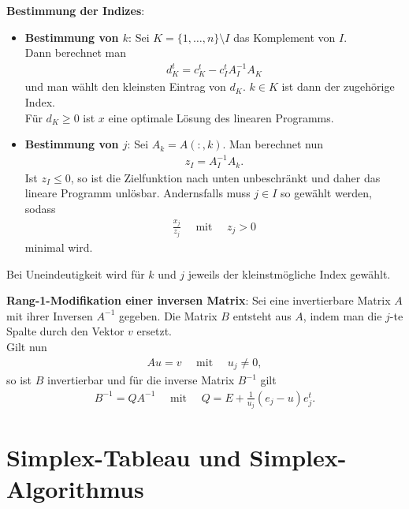 \textbf{Bestimmung der Indizes}:
\begin{itemize}
    \item
    \textbf{Bestimmung von $k$}:
    Sei $K = \{1, \dotsc, n\} \setminus I$ das Komplement von $I$. \\
    Dann berechnet man
    \begin{align*}
        d_K^t = c_K^t - c_I^t A_I^{-1} A_K
    \end{align*}
    und man wählt den kleinsten Eintrag von $d_K$.
    $k \in K$ ist dann der zugehörige Index. \\
    Für $d_K \ge 0$ ist $x$ eine optimale Lösung des linearen Programms.

    \item
    \textbf{Bestimmung von $j$}:
    Sei $A_k = A(:, k)$.
    Man berechnet nun
    \begin{align*}
        z_I = A_I^{-1} A_k.
    \end{align*}
    Ist $z_I \le 0$, so ist die Zielfunktion nach unten unbeschränkt
    und daher das lineare Programm unlösbar.
    Andernsfalls muss $j \in I$ so gewählt werden, sodass
    \begin{align*}
        \frac{x_j}{z_j} \quad\text{ mit }\quad z_j > 0
    \end{align*}
    minimal wird.
\end{itemize}
Bei Uneindeutigkeit wird für $k$ und $j$ jeweils der kleinstmögliche Index
gewählt.

\linie

\textbf{Rang-1-Modifikation einer inversen Matrix}:
Sei eine invertierbare Matrix $A$ mit ihrer Inversen $A^{-1}$ gegeben.
Die Matrix $B$ entsteht aus $A$, indem man die $j$-te Spalte durch den
Vektor $v$ ersetzt. \\
Gilt nun
\begin{align*}
    Au = v \quad\text{ mit }\quad u_j \not= 0,
\end{align*}
so ist $B$ invertierbar und für die inverse Matrix $B^{-1}$ gilt
\begin{align*}
    B^{-1} = QA^{-1} \quad\text{ mit }\quad
    Q = E + \frac{1}{u_j} (e_j - u) e_j^t.
\end{align*}

\pagebreak

\section{%
    Simplex-Tableau und Simplex-Algorithmus%
}

